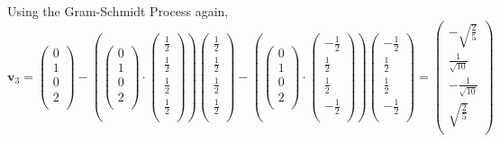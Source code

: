 \documentclass{article}
\begin{document}
Using the Gram-Schmidt Process again, \[{{\mathbf{v}}_{3}}=\left( \begin{matrix}
  0 \\ 
  1 \\ 
  0 \\ 
  2 \\ 
\end{matrix} \right)-\left( \left( \begin{matrix}
  0 \\ 
  1 \\ 
  0 \\ 
  2 \\ 
\end{matrix} \right)\cdot \left( \begin{matrix}
   \frac{1}{2}  \\
   \frac{1}{2}  \\
   \frac{1}{2}  \\
   \frac{1}{2}  \\
\end{matrix} \right) \right)\left( \begin{matrix}
   \frac{1}{2}  \\
   \frac{1}{2}  \\
   \frac{1}{2}  \\
   \frac{1}{2}  \\
\end{matrix} \right)-\left( \left( \begin{matrix}
  0 \\ 
  1 \\ 
  0 \\ 
  2 \\ 
\end{matrix} \right)\cdot \left( \begin{matrix}
   -\frac{1}{2}  \\
   \frac{1}{2}  \\
   \frac{1}{2}  \\
   -\frac{1}{2}  \\
\end{matrix} \right) \right)\left( \begin{matrix}
   -\frac{1}{2}  \\
   \frac{1}{2}  \\
   \frac{1}{2}  \\
   -\frac{1}{2}  \\
\end{matrix} \right)=\left( \begin{matrix}
   -\sqrt{\frac{2}{5}}  \\
   \frac{1}{\sqrt{10}}  \\
   -\frac{1}{\sqrt{10}}  \\
   \sqrt{\frac{2}{5}}  \\
\end{matrix} \right)\]
\end{document}
